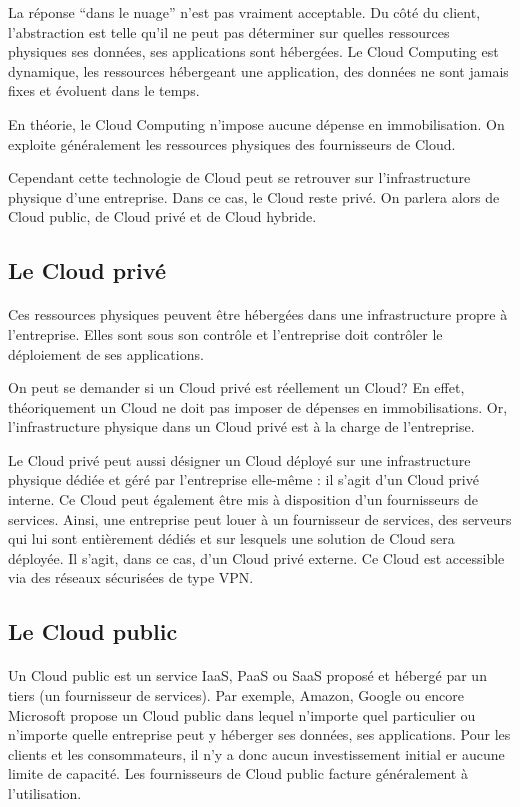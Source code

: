 \documentclass[a4paper,12pt]{report}
\begin{document}
\begin{onehalfspace}
	La réponse “dans le nuage” n’est pas vraiment acceptable. Du côté du client, l’abstraction est telle qu’il ne peut pas déterminer sur quelles ressources physiques ses données, ses applications sont hébergées. Le Cloud Computing est dynamique, les ressources hébergeant une application, des données ne sont jamais fixes et évoluent dans le temps.
	
En théorie, le Cloud Computing n’impose aucune dépense en immobilisation. On exploite généralement les ressources physiques des fournisseurs de Cloud.

	Cependant cette technologie de Cloud peut se retrouver sur l’infrastructure physique d’une entreprise. Dans ce cas, le Cloud reste privé. On parlera alors de Cloud public, de Cloud privé et de Cloud hybride.
	
	\subsection{Le Cloud privé}
	
	\paragraph*{}
	Ces ressources physiques peuvent être hébergées dans une infrastructure propre à l’entreprise. Elles sont sous son contrôle et l’entreprise doit contrôler le déploiement de ses applications.
	
	On peut se demander si un Cloud privé est réellement un Cloud? En effet, théoriquement un Cloud ne doit pas imposer de dépenses en immobilisations. Or, l’infrastructure physique dans un Cloud privé est à la charge de l’entreprise.
	
	Le Cloud privé peut aussi désigner un Cloud déployé sur une infrastructure physique dédiée et géré par l’entreprise elle-même : il s’agit d’un Cloud privé interne. Ce Cloud peut également être mis à disposition d’un fournisseurs de services. Ainsi, une entreprise peut louer à un fournisseur de services, des serveurs qui lui sont entièrement dédiés et sur lesquels une solution de Cloud sera déployée. Il s’agit, dans ce cas, d’un Cloud privé externe. Ce Cloud est accessible via des réseaux sécurisées de type VPN.
	
	\subsection{Le Cloud public}
	
	\paragraph*{}
	Un Cloud public est un service IaaS, PaaS ou SaaS proposé et hébergé par un tiers (un fournisseur de services). Par exemple, Amazon, Google ou encore Microsoft propose un Cloud public dans lequel n’importe quel particulier ou n’importe quelle entreprise peut y héberger ses données, ses applications. Pour les clients et les consommateurs, il n’y a donc aucun investissement initial er aucune limite de capacité. Les fournisseurs de Cloud public facture généralement à l’utilisation.	
	

\end{onehalfspace}
\end{document}
